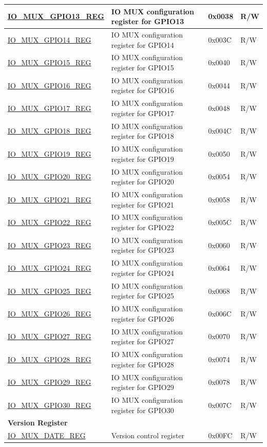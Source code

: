 \begin{longtable}{ | p{6cm} | p{7.6cm} | p{1.3cm} | p{1cm} | }
\hyperref[regdesc:IOMUXGPIONREG]{IO\_MUX\_GPIO13\_REG} & IO MUX configuration register for GPIO13 & 0x0038 & R/W \\ \hline
\hyperref[regdesc:IOMUXGPIONREG]{IO\_MUX\_GPIO14\_REG} & IO MUX configuration register for GPIO14 & 0x003C & R/W \\ \hline
\hyperref[regdesc:IOMUXGPIONREG]{IO\_MUX\_GPIO15\_REG} & IO MUX configuration register for GPIO15 & 0x0040 & R/W \\ \hline
\hyperref[regdesc:IOMUXGPIONREG]{IO\_MUX\_GPIO16\_REG} & IO MUX configuration register for GPIO16 & 0x0044 & R/W \\ \hline
\hyperref[regdesc:IOMUXGPIONREG]{IO\_MUX\_GPIO17\_REG} & IO MUX configuration register for GPIO17 & 0x0048 & R/W \\ \hline
\hyperref[regdesc:IOMUXGPIONREG]{IO\_MUX\_GPIO18\_REG} & IO MUX configuration register for GPIO18 & 0x004C & R/W \\ \hline
\hyperref[regdesc:IOMUXGPIONREG]{IO\_MUX\_GPIO19\_REG} & IO MUX configuration register for GPIO19 & 0x0050 & R/W \\ \hline
\hyperref[regdesc:IOMUXGPIONREG]{IO\_MUX\_GPIO20\_REG} & IO MUX configuration register for GPIO20 & 0x0054 & R/W \\ \hline
\hyperref[regdesc:IOMUXGPIONREG]{IO\_MUX\_GPIO21\_REG} & IO MUX configuration register for GPIO21 & 0x0058 & R/W \\ \hline
\hyperref[regdesc:IOMUXGPIONREG]{IO\_MUX\_GPIO22\_REG} & IO MUX configuration register for GPIO22 & 0x005C & R/W \\ \hline
\hyperref[regdesc:IOMUXGPIONREG]{IO\_MUX\_GPIO23\_REG} & IO MUX configuration register for GPIO23 & 0x0060 & R/W \\ \hline
\hyperref[regdesc:IOMUXGPIONREG]{IO\_MUX\_GPIO24\_REG} & IO MUX configuration register for GPIO24 & 0x0064 & R/W \\ \hline
\hyperref[regdesc:IOMUXGPIONREG]{IO\_MUX\_GPIO25\_REG} & IO MUX configuration register for GPIO25 & 0x0068 & R/W \\ \hline
\hyperref[regdesc:IOMUXGPIONREG]{IO\_MUX\_GPIO26\_REG} & IO MUX configuration register for GPIO26 & 0x006C & R/W \\ \hline
\hyperref[regdesc:IOMUXGPIONREG]{IO\_MUX\_GPIO27\_REG} & IO MUX configuration register for GPIO27 & 0x0070 & R/W \\ \hline
\hyperref[regdesc:IOMUXGPIONREG]{IO\_MUX\_GPIO28\_REG} & IO MUX configuration register for GPIO28 & 0x0074 & R/W \\ \hline
\hyperref[regdesc:IOMUXGPIONREG]{IO\_MUX\_GPIO29\_REG} & IO MUX configuration register for GPIO29 & 0x0078 & R/W \\ \hline
\hyperref[regdesc:IOMUXGPIONREG]{IO\_MUX\_GPIO30\_REG} & IO MUX configuration register for GPIO30 & 0x007C & R/W \\ \hline
\multicolumn{4}{|l|}{\textbf{Version Register}} \\ \hline
\hyperref[regdesc:IOMUXDATEREG]{IO\_MUX\_DATE\_REG} & Version control register & 0x00FC & R/W \\ \hline
\end{longtable}
